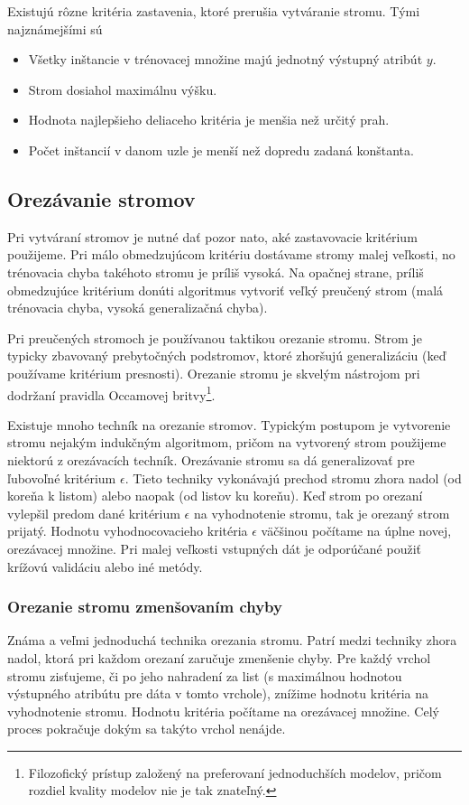 Existujú rôzne kritéria zastavenia, ktoré prerušia vytváranie stromu. Tými najznámejšími sú

\begin{itemize}
\item Všetky inštancie v trénovacej množine majú jednotný výstupný atribút $y$.
\item Strom dosiahol maximálnu výšku.
\item Hodnota najlepšieho deliaceho kritéria je menšia než určitý prah.
\item Počet inštancií v danom uzle je menší než dopredu zadaná konštanta.
\end{itemize}

\subsection{Orezávanie stromov}\label{kap1:2.7:2.7.1:Pruning}
Pri vytváraní stromov je nutné dať pozor nato, aké zastavovacie kritérium použijeme. Pri málo obmedzujúcom kritériu dostávame stromy malej veľkosti, no trénovacia chyba takéhoto stromu je príliš vysoká. Na opačnej strane, príliš obmedzujúce kritérium donúti algoritmus vytvoriť veľký preučený strom (malá trénovacia chyba, vysoká generalizačná chyba).

Pri preučených stromoch je používanou taktikou orezanie stromu. Strom je typicky zbavovaný prebytočných podstromov, ktoré zhoršujú generalizáciu (keď používame kritérium presnosti). Orezanie stromu je skvelým nástrojom pri dodržaní pravidla Occamovej britvy\footnote{Filozofický prístup založený na preferovaní jednoduchších modelov, pričom rozdiel kvality modelov nie je tak znateľný.}.

Existuje mnoho techník na orezanie stromov. Typickým postupom je vytvorenie stromu nejakým indukčným algoritmom, pričom na vytvorený strom použijeme niektorú z orezávacích techník.
Orezávanie stromu sa dá generalizovať pre ľubovoľné kritérium $\epsilon$.
Tieto techniky vykonávajú prechod stromu zhora nadol (od koreňa k listom) alebo naopak (od listov ku koreňu). Keď strom po orezaní vylepšil predom dané kritérium $\epsilon$ na vyhodnotenie stromu, tak je orezaný strom prijatý.
Hodnotu vyhodnocovacieho kritéria $\epsilon$ väčšinou počítame na úplne novej, orezávacej množine. Pri malej veľkosti vstupných dát je odporúčané použiť krížovú validáciu alebo iné metódy.
\subsubsection{Orezanie stromu zmenšovaním chyby}
Známa a veľmi jednoduchá technika orezania stromu. Patrí medzi techniky zhora nadol, ktorá pri každom orezaní zaručuje zmenšenie chyby. Pre každý vrchol stromu zisťujeme, či po jeho nahradení za list (s maximálnou hodnotou výstupného atribútu pre dáta v tomto vrchole), znížime hodnotu kritéria na vyhodnotenie stromu. Hodnotu kritéria počítame na orezávacej množine. Celý proces pokračuje dokým sa takýto vrchol nenájde.
